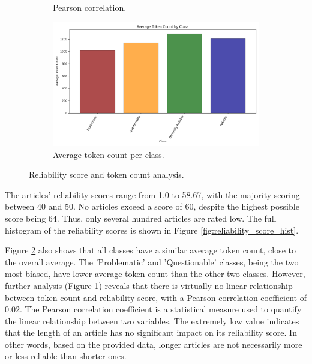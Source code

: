 \begin{figure}[htbp]
\begin{subfigure}{0.49\linewidth}
        \caption{Pearson correlation.}
        \label{fig:pearson}
    \end{subfigure}
    \begin{subfigure}{0.56\linewidth}
        \centering
        \includegraphics[width=1\linewidth]{figures/token_count_vx_per_class_hist.png}
        \caption{Average token count per class.}
        \label{fig:avg_token_per_class}
    \end{subfigure}
    \caption{Reliability score and token count analysis.}
    \label{fig:reliability_token_analysis}
\end{figure}

The articles' reliability scores range from 1.0 to 58.67, with the majority scoring between 40 and 50. No articles exceed a score of 60, despite the highest possible score being 64. Thus, only several hundred articles are rated low. The full histogram of the reliability scores is shown in Figure \ref{fig:reliability_score_hist}.

Figure \ref{fig:avg_token_per_class} also shows that all classes have a similar average token count, close to the overall average. The 'Problematic' and 'Questionable' classes, being the two most biased, have lower average token count than the other two classes. However, further analysis (Figure \ref{fig:pearson}) reveals that there is virtually no linear relationship between token count and reliability score, with a Pearson correlation coefficient  \cite{pearson-1896} of 0.02. The Pearson correlation coefficient \cite{pearson-1896} is a statistical measure used to quantify the linear relationship between two variables. The extremely low value indicates that the length of an article has no significant impact on its reliability score. In other words, based on the provided data, longer articles are not necessarily more or less reliable than shorter ones.



